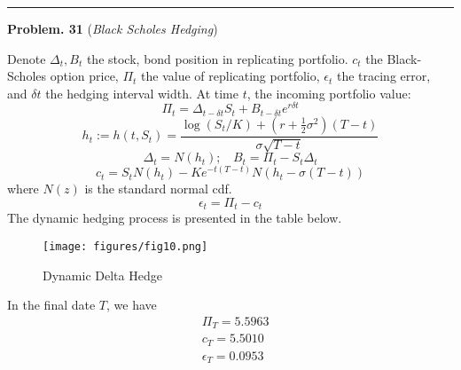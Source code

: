 \documentclass[10 pt]{hwtemplate} %
\begin{document}
\noindent\rule{16cm}{0.4pt}
\textbf{Problem. 31} (\textit{Black Scholes Hedging})\\
\begin{solution} Denote $\Delta_t, B_t$ the stock, bond position in replicating portfolio. $c_t$ the Black-Scholes option price, $\Pi_t$ the value of replicating portfolio, $\epsilon_t$ the tracing error, and $\delta t$ the hedging interval width. At time $t$, the incoming portfolio value:
$$
\Pi_t = \Delta_{t-\delta t} S_t + B_{t-\delta t} e^{r \delta t}
$$
$$
h_t := h(t, S_t) = \frac{\log(S_t/K)+(r+\tfrac{1}{2}\sigma^2)(T-t)}{\sigma \sqrt{T-t}}
$$
$$
\Delta_t = N(h_t);~~~~B_t = \Pi_t - S_t \Delta_t
$$
$$
c_t = S_tN(h_t) - Ke^{-t(T-t)}N(h_t-\sigma(T-t))
$$
where $N(z)$ is the standard normal cdf.
$$
\epsilon_t = \Pi_t - c_t
$$
The dynamic hedging process is presented in the table below. 

\begin{figure}[H]
  \centering
  \captionsetup{justification=centering}
  \caption{\label{fig:q31pa}Dynamic Delta Hedge}
  \texttt{[image: figures/fig10.png]}
\end{figure}

In the final date $T$, we have
\begin{equation}
  \begin{split}
    &\Pi_T = 5.5963\\
    &c_T = 5.5010\\
    &\epsilon_T = 0.0953
  \end{split}
\end{equation}
\end{solution}
\end{document}
